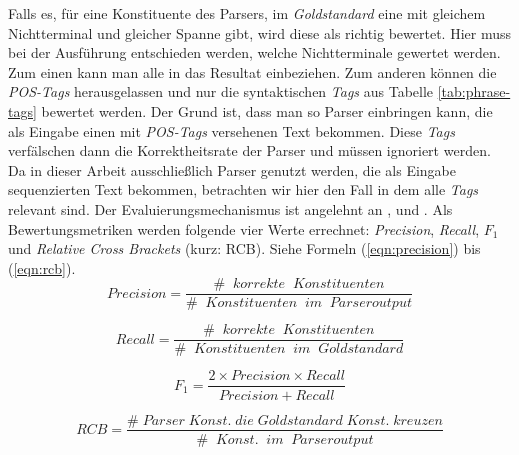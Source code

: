 Falls es, für eine Konstituente des Parsers, im \textit{Goldstandard} eine mit gleichem Nichtterminal und gleicher Spanne gibt, wird diese als richtig bewertet. Hier muss bei der Ausführung entschieden werden, welche Nichtterminale gewertet werden. Zum einen kann man alle in das Resultat einbeziehen. Zum anderen können die \textit{POS-Tags} herausgelassen und nur die syntaktischen \textit{Tags} aus Tabelle \ref{tab:phrase-tags} bewertet werden. Der Grund ist, dass man so Parser einbringen kann, die als Eingabe einen mit \textit{POS-Tags} versehenen Text bekommen. Diese \textit{Tags} verfälschen dann die Korrektheitsrate der Parser und müssen ignoriert werden. Da in dieser Arbeit ausschließlich Parser genutzt werden, die als Eingabe sequenzierten Text bekommen, betrachten wir hier den Fall in dem alle \textit{Tags} relevant sind. Der Evaluierungsmechanismus ist angelehnt an \cite{parseval}, \cite{crossbrackets} und \cite{nlpGrun dlagen}.
Als Bewertungsmetriken werden folgende vier Werte errechnet: \textit{Precision}, \textit{Recall}, \(F_1\) und \textit{Relative Cross Brackets} (kurz: RCB). Siehe Formeln (\ref{eqn:precision}) bis (\ref{eqn:rcb}). \\ 
\begin{equation}
Precision = \frac{\# \;\; korrekte \;\; Konstituenten}{ \# \;\; Konstituenten \;\; im \;\; Parseroutput}
\label{eqn:precision}
\end{equation}

\begin{equation}
Recall = \frac{\# \;\; korrekte \;\; Konstituenten}{ \# \;\; Konstituenten \;\; im \;\; Goldstandard}
\end{equation}

\begin{equation}
F_1 = \frac{2 \times Precision \times Recall}{ Precision + Recall}
\end{equation}

\begin{equation}
RCB = \frac{\# \; Parser \; Konst. \; die \; Goldstandard \; Konst. \; kreuzen}{ \# \;\; Konst. \;\; im \;\; Parseroutput}
\label{eqn:rcb}
\end{equation}

